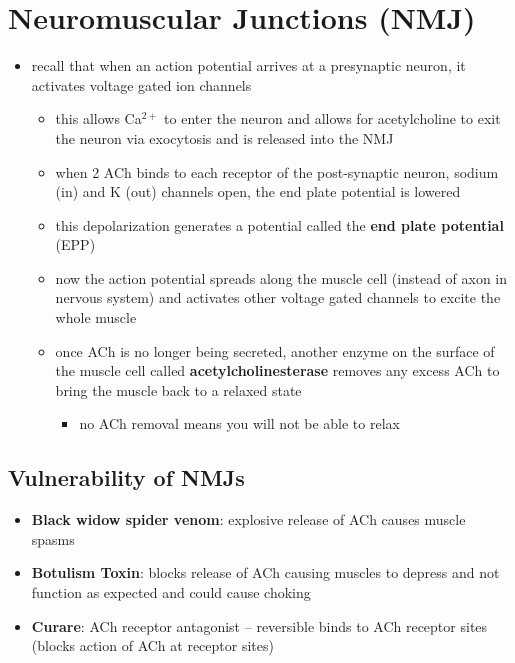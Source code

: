 \documentclass[10pt]{article}
\begin{document}
\section{Neuromuscular Junctions (NMJ)}
\begin{itemize}
    \item recall that when an action potential arrives at a presynaptic neuron, it activates voltage gated ion channels
        \begin{itemize}
            \item this allows Ca$^{2+}$ to enter the neuron and allows for acetylcholine to exit the neuron via exocytosis and is released into the NMJ
            \item when 2 ACh binds to each receptor of the post-synaptic neuron, sodium (in) and K (out) channels open, the end plate potential is lowered
            \item this depolarization generates a potential called the \textbf{end plate potential} (EPP)
            \item now the action potential spreads along the muscle cell (instead of axon in nervous system) and activates other voltage gated channels to excite the whole muscle
            \item once ACh is no longer being secreted, another enzyme on the surface of the muscle cell called \textbf{acetylcholinesterase} removes any excess ACh to bring the muscle back to a relaxed state
            \begin{itemize}
                \item no ACh removal means you will not be able to relax
            \end{itemize}
        \end{itemize}
\end{itemize}

\subsection{Vulnerability of NMJs}
\begin{itemize}
    \item \textbf{Black widow spider venom}: explosive release of ACh causes muscle spasms
    \item \textbf{Botulism Toxin}: blocks release of ACh causing muscles to depress and not function as expected and could cause choking
    \item \textbf{Curare}: ACh receptor antagonist -- reversible binds to ACh receptor sites (blocks action of ACh at receptor sites)
\end{itemize}
\end{document}
